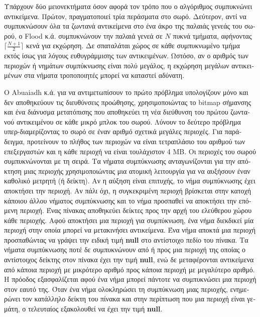 \begin{greek}
Υπάρχουν δύο μειονεκτήματα όσον αφορά τον τρόπο που ο αλγόριθμος
συμπυκνώνει αντικείμενα. Πρώτον, πραγματοποιεί τρία περάσματα
στο σωρό. Δεύτερον, αντί να συμπυκνώσουν όλα τα ζωντανά αντικείμενα
στο ένα άκρο της παλαιάς γενεάς του σωρού, ο Flood κ.ά. συμπυκνώνουν
την παλαιά γενεά σε $N$ πυκνά τμήματα, αφήνοντας $\lceil{\frac{N+1}{2}}\rceil$
κενά για εκχώρηση. Δε σπαταλάται χώρος σε κάθε συμπυκνωμένο τμήμα
εκτός ίσως για λόγους ευθυγράμμισης των αντικειμένων. Ωστόσο, αν
ο αριθμός των περιοχών ή νημάτων συμπύκνωσης είναι πολύ μεγάλος,
η εκχώρηση μεγάλων αντικειμένων στα νήματα τροποποιητές μπορεί
να καταστεί αδύνατη.

Ο Abuaiadh κ.ά. \cite{DBLP:conf/oopsla/AbuaiadhOPS04} για να αντιμετωπίσουν
το πρώτο πρόβλημα υπολογίζουν μόνο και δεν αποθηκεύουν τις διευθύνσεις
προώθησης, χρησιμοποιώντας το bitmap σήμανσης και ένα διάνυσμα
μετατόπισης που αποθηκεύει τη νέα διεύθυνση του πρώτου ζωντανού
αντικειμένου σε κάθε μικρό μπλοκ του σωρού. Λύνουν το δεύτερο πρόβλημα
υπερ-διαμερίζοντας το σωρό σε έναν αριθμό σχετικά μεγάλες περιοχές.
Για παράδειγμα, προτείνουν το πλήθος των περιοχών να είναι τετραπλάσιο
του αριθμού των επεξεργαστών και η κάθε περιοχή να είναι τουλάχιστον
4 MB. Οι περιοχές του σωρού συμπυκνώνονται με τη σειρά. Τα νήματα
συμπύκνωσης ανταγωνίζονται για την απόκτηση μιας περιοχής χρησιμοποιώντας
μια ατομική λειτουργία για να αυξήσουν έναν καθολικό μετρητή (ή
δείκτη). Αν η αύξηση είναι επιτυχής, το νήμα συμπύκνωσης έχει
αποκτήσει την περιοχή. Αν πάλι όχι, η συγκεκριμένη περιοχή βρίσκεται
στην κατοχή κάποιου άλλου νήματος συμπύκνωσης και το νήμα προσπαθεί
να αποκτήσει την επόμενη περιοχή. Ένας πίνακας αποθηκεύει δείκτες
προς την αρχή του ελεύθερου χώρου κάθε περιοχής. Αφού αποκτήσει
μια περιοχή για συμπύκνωση, ένα νήμα διεκδικεί μία περιοχή στην
οποία μπορεί να μετακινήσει αντικείμενα. Ένα νήμα αποκτά μια
περιοχή προσπαθώντας να γράψει την ειδική τιμή \textbf{null}
στο αντίστοιχο πεδίο του πίνακα. Τα νήματα συμπύκνωσης ποτέ δε
συμπυκνώνουν από ή προς μια περιοχή της οποίας ο αντίστοιχος
δείκτης στον πίνακα έχει την τιμή \textbf{null}, ενώ δε μεταφέρονται
αντικείμενα από κάποια περιοχή με μικρότερο αριθμό προς κάποια
περιοχή με μεγαλύτερο αριθμό. Η πρόοδος εξασφαλίζεται αφού ένα
νήμα μπορεί πάντοτε να συμπυκνώσει μια περιοχή στον εαυτό της.
Όταν ένα νήμα ολοκληρώσει τη συμπύκνωση μιας περιοχής, ενημερώνει
τον κατάλληλο δείκτη του πίνακα και στην περίπτωση που μια περιοχή
είναι γεμάτη, ο τελευταίος εξακολουθεί να έχει την τιμή \textbf{null}.


\end{greek}
